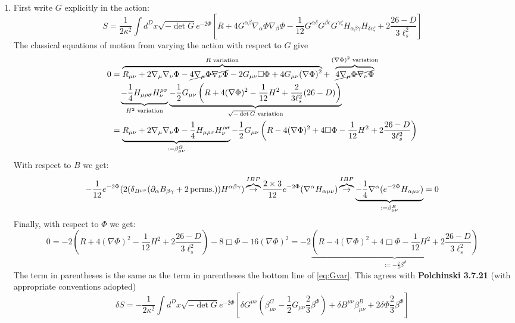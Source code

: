 \documentclass[11pt, class=article, crop=false]{standalone}
\begin{document}
\begin{enumerate}
	\item First write $G$ explicitly in the action:
	\[
		S = \frac{1}{2\kappa^2} \int d^D x \sqrt{- \det G } e^{-2 \Phi} \left[R + 4 G^{\alpha \beta} \nabla_\alpha \Phi \nabla_\beta \Phi - \frac{1}{12} G^{\alpha \delta} G^{\beta \epsilon} G^{\gamma \zeta} H_{\alpha \beta \gamma} H_{\delta \epsilon \zeta} + 2 \frac{26 - D}{3 \ell_s^2} \right]
	\]
	 The classical equations of motion from varying the action with respect to $G$ give
	\begin{equation}\label{eq:Gvar}
	\begin{aligned}
			0 &= \overbrace{R_{\mu \nu} + 2 \nabla_\mu \nabla_\nu \Phi - \cancel{4 \nabla_\mu \Phi \nabla_\nu \Phi}  - 2 G_{\mu \nu} \Box \Phi + 4 G_{\mu \nu} (\nabla \Phi)^2}^{R \text{ variation}} + \overbrace{\cancel{4 \nabla_\mu \Phi \nabla_\nu \Phi}}^{(\nabla \Phi)^2 \text{ variation}}\\
			& \quad \underbrace{-\frac14 H_{\mu \rho \sigma} H_{\nu}^{\rho \sigma}}_{H^2 \text{ variation}}  \underbrace{- \frac12 G_{\mu \nu} \left( R + 4 (\nabla \Phi)^2 - \frac{1}{12} H^2 + \frac{2}{3 \ell_s^2} (26-D)  \right)}_{\sqrt{-\det G} \text{ variation}}\\
			& = \underbrace{R_{\mu \nu} + 2 \nabla_\mu \nabla_\nu \Phi - \frac14 H_{\mu \rho \sigma} H_{\nu}^{\rho \sigma}}_{:= \beta^G_{\mu \nu}} - \frac12 G_{\mu \nu} \left(R - 4 (\nabla \Phi)^2 + 4 \Box \Phi -\frac{1}{12} H^2 + 2 \frac{26 - D}{3 \ell_s^2} \right)
		\end{aligned}
	\end{equation}
	With respect to $B$ we get:
	\[
		-\frac{1}{12} e^{-2 \Phi} (2 (\delta_{B^{\mu \nu}} (\partial_\alpha B_{\beta \gamma} + 2 \,\mathrm{perms.})) H^{\alpha \beta \gamma} ) \overbrace{\to}^{IBP} \frac{2 \times 3}{12} e^{-2 \Phi} (\nabla^\alpha H_{\alpha \mu \nu})  \overbrace{\to}^{IBP} \underbrace{ - \frac14 \nabla^\alpha (e^{-2\Phi} H_{\alpha \mu \nu})}_{:= \beta^B_{\mu \nu}} = 0
	\]
	Finally, with respect to $\Phi$ we get:
	\[
		0 = -2 \left(R + 4(\nabla \Phi)^2 -\frac{1}{12} H^2 + 2 \frac{26 - D}{3 \ell_s^2}\right) - 8 \Box \Phi - 16 (\nabla \Phi)^2 = -2 \underbrace{\left( R - 4 (\nabla \Phi)^2 + 4 \Box \Phi - \frac{1}{12} H^2 + 2 \frac{26 - D}{3 \ell_s^2}\right)}_{:=-\frac23 \beta^\Phi}
	\]
	The term in parentheses is the same as the term in parentheses the bottom line of \eqref{eq:Gvar}. 
	This agrees with \textbf{Polchinski 3.7.21} (with appropriate conventions adopted)
	\[
		\delta S = - \frac{1}{2\kappa^2} \int d^D x \sqrt{- \det G} e^{-2 \Phi} \left[\delta G^{\mu \nu} \left(\beta^G_{\mu \nu} - \frac12 G_{\mu \nu} \frac23 \beta^\Phi \right) + \delta B^{\mu \nu} \beta^B_{\mu \nu} + 2 \delta \Phi \frac23 \beta^\Phi \right]
	\]
	

\end{enumerate}
\end{document}

